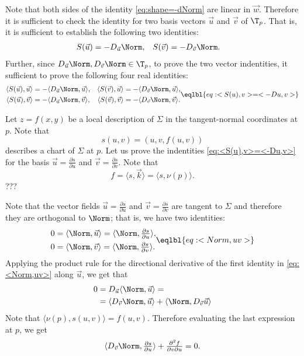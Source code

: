 Note that both sides of the identity \ref{eq:shape=-dNorm} are linear in $\vec w$.
Therefore it is sufficient to check the identity for two basis vectors $\vec u$ and $\vec v$ of $\T_p$.
That is, it is sufficient to establish the following two identities:
\begin{align*}
S(\vec u)&= -D_{\vec u}\Norm,
&
S(\vec v)&= -D_{\vec v}\Norm.
\end{align*}
Further, since $D_{\vec u}\Norm,D_{\vec v}\Norm\in\T_p$, to prove the two vector indentities, it sufficient to prove the following four real identities:
\[\begin{aligned}
\langle S(\vec u),\vec u\rangle &= -\langle D_{\vec u}\Norm,\vec u\rangle,
&
\langle S(\vec v),\vec u\rangle &= -\langle D_{\vec v}\Norm,\vec u\rangle,
\\
\langle S(\vec u),\vec v\rangle &= -\langle D_{\vec u}\Norm,\vec v\rangle,
&
\langle S(\vec v),\vec v\rangle &= -\langle D_{\vec v}\Norm,\vec v\rangle.
\end{aligned}
\eqlbl{eq:<S(u),v>=<-Du,v>}
\]

Let $z=f(x,y)$ be a local description of $\Sigma$ in the tangent-normal coordinates at $p$.
Note that 
\[s(u,v)=(u,v,f(u,v))\]
describes a chart of $\Sigma$ at $p$.
Let us prove the indentities \ref{eq:<S(u),v>=<-Du,v>} for the basis $\vec u=\tfrac{\partial s}{\partial u}$ and $\vec v=\tfrac{\partial s}{\partial v}$.
Note that 
\[f=\langle s, \vec k\rangle=\langle s, \nu(p)\rangle.\]???


Note that the vector fields $\vec u=\tfrac{\partial s}{\partial u}$ and $\vec v=\tfrac{\partial s}{\partial v}$ are tangent to $\Sigma$  and therefore they are orthogonal to $\Norm$;
that is, we have two identities:
\[\begin{aligned}
0&=\langle \Norm,\vec u\rangle=\langle \Norm,\tfrac{\partial s}{\partial u}\rangle,
\\
0&=\langle \Norm,\vec v\rangle=\langle \Norm,\tfrac{\partial s}{\partial v}\rangle.
\end{aligned}
\eqlbl{eq:<Norm,uv>}\]
Applying the product rule for the directional derivative of the first identity in \ref{eq:<Norm,uv>} along $\vec u$, we get that
\begin{align*}
0&=D_{\vec u}\langle \Norm,\vec u\rangle=
\\
&=\langle D_{\vec v}\Norm,\vec u\rangle
+
\langle \Norm,D_{\vec v}\vec u\rangle
\end{align*}
Note that $\langle\nu(p),s(u,v)\rangle=f(u,v)$.
Therefore evaluating the last expression at $p$, we get
\[\langle D_{\vec v}\Norm,\tfrac{\partial s}{\partial u}\rangle+\tfrac{\partial^2 f}{\partial v\partial u}=0.\]



